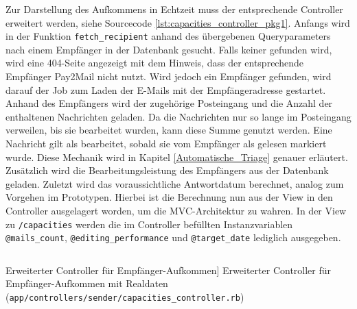 \noindent Zur Darstellung des Aufkommens in Echtzeit muss der entsprechende Controller erweitert werden, siehe Sourcecode \ref{lst:capacities_controller_pkg1}. Anfangs wird in der Funktion \texttt{fetch\_recipient} anhand des übergebenen Queryparameters nach einem Empfänger in der Datenbank gesucht. Falls keiner gefunden wird, wird eine 404-Seite angezeigt mit dem Hinweis, dass der entsprechende Empfänger Pay2Mail nicht nutzt. Wird jedoch ein Empfänger gefunden, wird darauf der Job zum Laden der E-Mails mit der Empfängeradresse gestartet. Anhand des Empfängers wird der zugehörige Posteingang und die Anzahl der enthaltenen Nachrichten geladen. Da die Nachrichten nur so lange im Posteingang verweilen, bis sie bearbeitet wurden, kann diese Summe genutzt werden. Eine Nachricht gilt als bearbeitet, sobald sie vom Empfänger als gelesen markiert wurde. Diese Mechanik wird in Kapitel \ref{Automatische_Triage} genauer erläutert. Zusätzlich wird die Bearbeitungsleistung des Empfängers aus der Datenbank geladen. Zuletzt wird das voraussichtliche Antwortdatum berechnet, analog zum Vorgehen im Prototypen. Hierbei ist die Berechnung nun aus der View in den Controller ausgelagert worden, um die MVC-Architektur zu wahren. In der View zu \texttt{/capacities} werden die im Controller befüllten Instanzvariablen \texttt{@mails\_count}, \texttt{@editing\_performance} und \texttt{@target\_date} lediglich ausgegeben.

\begin{listing}[!ht]
\inputminted[linenos]{ruby}{Listings/Pkg1/capacities_controller.rb}

\caption
    [Erweiterter Controller für Empfänger-Aufkommen]
    {Erweiterter Controller für Empfänger-Aufkommen mit Realdaten (\texttt{app/controllers/sender/capacities\_controller.rb})}

\label{lst:capacities_controller_pkg1}
\end{listing}


